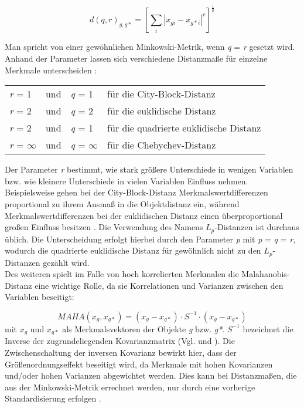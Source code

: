 \begin{equation}
d(q,r)_{g,g*} = 
\left[	\sum_{i} |x_{gi} - x_{g*i}|^r	\right]^\frac{1}{q}
\end{equation}

Man spricht von einer gewöhnlichen Minkowski-Metrik, wenn \textit{q} = \textit{r} gesetzt wird. Anhand der Parameter lassen sich verschiedene Distanzmaße für einzelne Merkmale unterscheiden \citep[Vgl.][S. 219]{Bacher.2010}:
\begin{center}
\begin{tabular}{lcll}
	\textit{r} = 1 & und & \textit{q} = 1 & für die City-Block-Distanz \\
	\textit{r} = 2 & und & \textit{q} = 2 & für die euklidische Distanz \\
	\textit{r} = 2 & und & \textit{q} = 1 & für die quadrierte euklidische Distanz \\
	\textit{r} = $\infty$ & und & \textit{q} = $\infty$ & für die Chebychev-Distanz \\
\end{tabular}
\end{center}

Der Parameter \textit{r} bestimmt, wie stark größere Unterschiede in wenigen Variablen bzw. wie kleinere Unterschiede in vielen Variablen Einfluss nehmen. Beispielsweise gehen bei der City-Block-Distanz Merkmalswertdifferenzen proportional zu ihrem Ausmaß in die Objektdistanz ein, während Merkmalswertdifferenzen bei der euklidischen Distanz einen überproportional großen Einfluss besitzen \citep[Vgl.][S. 212]{Eckey.2002}. Die Verwendung des Namens $L_p$-Distanzen ist durchaus üblich. Die Unterscheidung erfolgt hierbei durch den Parameter \textit{p} mit \textit{p} = \textit{q} = \textit{r}, wodurch die quadrierte euklidische Distanz für gewöhnlich nicht zu den $L_p$-Distanzen gezählt wird. \\

Des weiteren spielt im Falle von hoch korrelierten Merkmalen die Malahanobis-Distanz eine wichtige Rolle, da sie Korrelationen und Varianzen zwischen den Variablen beseitigt:

\begin{equation}
MAHA(x_{g},x_{g*}) = (x_{g} - x_{g*}) \cdot S^{-1} \cdot (x_{g} - x_{g*})
\end{equation}
mit $x_{g}$ und $x_{g*}$ als Merkmalsvektoren der Objekte \textit{g} bzw. \textit{g*}. $S^{-1}$ bezeichnet die Inverse der zugrundeliegenden Kovarianzmatrix (Vgl. \citealt[S. 339]{Bacher.2010} und \citealt[S. 168]{Bankhofer.2008}). Die Zwischenschaltung der inversen Kovarianz bewirkt hier, dass der Größenordnungseffekt beseitigt wird, da Merkmale mit hohen Kovarianzen und/oder hohen Varianzen abgewichtet werden. Dies kann bei Distanzmaßen, die aus der Minkowski-Metrik errechnet werden, nur durch eine vorherige Standardisierung erfolgen \citep[Vgl.][S. 214]{Eckey.2002}.
